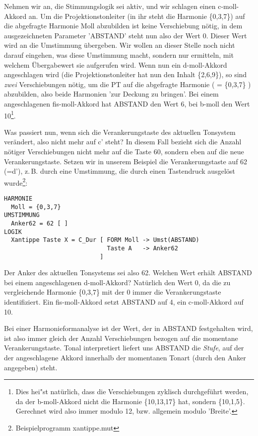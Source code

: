 Nehmen wir an, die Stimmungslogik  sei aktiv, und wir
schlagen einen c-moll-Akkord an. Um die Projektionstonleiter (in ihr
steht die Harmonie \{0,3,7\}) auf die abgefragte Harmonie Moll
abzubilden ist keine Verschiebung nötig, in dem ausgezeichneten
Parameter 'ABSTAND' steht nun 
also der Wert 0. Dieser Wert wird an die Umstimmung 
übergeben. Wir wollen an dieser Stelle noch nicht darauf eingehen, was
diese Umstimmung macht, sondern nur ermitteln, mit welchem
Übergabewert sie aufgerufen wird. Wenn nun ein d-moll-Akkord
angeschlagen wird (die Projektionstonleiter hat nun den Inhalt
\{2,6,9\}), so sind \emph{zwei} Verschiebungen nötig, um die PT auf die
abgefragte Harmonie ( = \{0,3,7\} ) abzubilden, also beide Harmonien
'zur Deckung zu bringen'. Bei einem angeschlagenen fis-moll-Akkord hat
ABSTAND den Wert 6, bei b-moll den Wert 10\footnote{Dies hei"st
  natürlich, dass die Verschiebungen zyklisch durchgeführt werden, da
  der b-moll-Akkord nicht die Harmonie \{10,13,17\} hat, sondern
  \{10,1,5\}. Gerechnet wird also immer modulo 12, bzw.  allgemein
  modulo 'Breite'.}.

Was passiert nun, wenn sich die Verankerungstaste des aktuellen Tonsystem 
verändert, also nicht mehr auf c' steht? In diesem Fall bezieht sich die 
Anzahl nötiger Verschiebungen nicht mehr auf die Taste 60, sondern eben 
auf die neue Verankerungstaste. Setzen wir in unserem Beispiel die 
Verankerungstaste auf 62 (=d'), z.\,B. durch eine Umstimmung, die durch 
einen Tastendruck ausgelöst wurde\footnote{Beispielprogramm xantippe.mut}:
\label{XANTIPPE}

\begin{verbatim}
HARMONIE 
  Moll = {0,3,7}
UMSTIMMUNG
  Anker62 = 62 [ ]
LOGIK
  Xantippe Taste X = C_Dur [ FORM Moll -> Umst(ABSTAND)
                             Taste A   -> Anker62
                           ]
\end{verbatim}
Der Anker des aktuellen Tonsystems sei also 62. Welchen Wert erhält 
ABSTAND bei einem angeschlagenen d-moll-Akkord? Natürlich den Wert 0, da 
die zu vergleichende Harmonie \{0,3,7\} mit der 0 immer die 
Verankerungstaste identifiziert. Ein fis-moll-Akkord setzt ABSTAND auf 4, 
ein c-moll-Akkord auf 10.

Bei einer Harmonieformanalyse ist der Wert, der in ABSTAND festgehalten 
wird, ist also immer gleich der Anzahl Verschiebungen bezogen auf die 
momentane Verankerungstaste. Tonal interpretiert liefert uns ABSTAND die 
\emph{Stufe}, auf der der angeschlagene Akkord innerhalb der momentanen 
Tonart (durch den Anker angegeben) steht.

